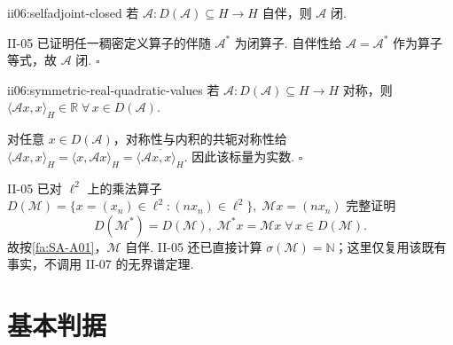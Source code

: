 \begin{FACorollary}[A][自伴算子必闭]{ii06:selfadjoint-closed}
若 \(\displaystyle\mathcal A:D(\mathcal A)\subseteq H\to H\) 自伴，则 \(\displaystyle\mathcal A\) 闭.
\end{FACorollary}

\begin{FAProof}
II-05 已证明任一稠密定义算子的伴随 \(\displaystyle\mathcal A^*\) 为闭算子. 自伴性给 \(\displaystyle\mathcal A=\mathcal A^*\) 作为算子等式，故 \(\displaystyle\mathcal A\) 闭.
\hfill\(\square\)
\end{FAProof}

\begin{FAProposition}[B][对称算子的二次值为实数]{ii06:symmetric-real-quadratic-values}
若 \(\displaystyle\mathcal A:D(\mathcal A)\subseteq H\to H\) 对称，则
\(\displaystyle \langle\mathcal Ax,x\rangle_H\in\mathbb R \; \forall\,x\in D(\mathcal A).\)
\end{FAProposition}

\begin{FAProof}
对任意 \(\displaystyle x\in D(\mathcal A)\)，对称性与内积的共轭对称性给
\(\displaystyle \langle\mathcal Ax,x\rangle_H = \langle x,\mathcal Ax\rangle_H = \overline{\langle\mathcal Ax,x\rangle_H}.\)
因此该标量为实数.
\hfill\(\square\)
\end{FAProof}

\begin{FAExample}[无界乘法算子模型的自伴性]
II-05 已对 \(\displaystyle\ell^2\) 上的乘法算子
\(\displaystyle D(\mathcal M)=\{x=(x_n)\in\ell^2:(nx_n)\in\ell^2\}, \; \mathcal Mx=(nx_n)\)
完整证明
\[
D(\mathcal M^*)=D(\mathcal M),
\;
\mathcal M^*x=\mathcal Mx
\;
\forall\,x\in D(\mathcal M).
\]
故按\autoref{fa:SA-A01}，\(\displaystyle\mathcal M\) 自伴. II-05 还已直接计算 \(\displaystyle\sigma(\mathcal M)=\mathbb N\)；这里仅复用该既有事实，不调用 II-07 的无界谱定理.
\end{FAExample}

\section{基本判据}\label{sec:ii06-basic-criteria}

